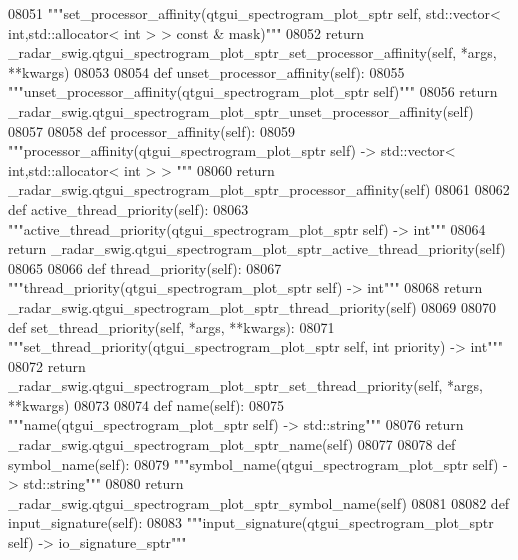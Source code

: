 \begin{DoxyCode}
{{{{{{{{{{{{{{{{{{{{{{{{{{08051         \textcolor{stringliteral}{"""set\_processor\_affinity(qtgui\_spectrogram\_plot\_sptr self, std::vector< int,std::allocator< int >
       > const & mask)"""}
08052         \textcolor{keywordflow}{return} \_radar\_swig.qtgui\_spectrogram\_plot\_sptr\_set\_processor\_affinity(self, *args, **kwargs)
08053 
08054     \textcolor{keyword}{def }unset_processor_affinity(self):
08055         \textcolor{stringliteral}{"""unset\_processor\_affinity(qtgui\_spectrogram\_plot\_sptr self)"""}
08056         \textcolor{keywordflow}{return} \_radar\_swig.qtgui\_spectrogram\_plot\_sptr\_unset\_processor\_affinity(self)
08057 
08058     \textcolor{keyword}{def }processor_affinity(self):
08059         \textcolor{stringliteral}{"""processor\_affinity(qtgui\_spectrogram\_plot\_sptr self) -> std::vector< int,std::allocator< int > >
      """}
08060         \textcolor{keywordflow}{return} \_radar\_swig.qtgui\_spectrogram\_plot\_sptr\_processor\_affinity(self)
08061 
08062     \textcolor{keyword}{def }active_thread_priority(self):
08063         \textcolor{stringliteral}{"""active\_thread\_priority(qtgui\_spectrogram\_plot\_sptr self) -> int"""}
08064         \textcolor{keywordflow}{return} \_radar\_swig.qtgui\_spectrogram\_plot\_sptr\_active\_thread\_priority(self)
08065 
08066     \textcolor{keyword}{def }thread_priority(self):
08067         \textcolor{stringliteral}{"""thread\_priority(qtgui\_spectrogram\_plot\_sptr self) -> int"""}
08068         \textcolor{keywordflow}{return} \_radar\_swig.qtgui\_spectrogram\_plot\_sptr\_thread\_priority(self)
08069 
08070     \textcolor{keyword}{def }set_thread_priority(self, *args, **kwargs):
08071         \textcolor{stringliteral}{"""set\_thread\_priority(qtgui\_spectrogram\_plot\_sptr self, int priority) -> int"""}
08072         \textcolor{keywordflow}{return} \_radar\_swig.qtgui\_spectrogram\_plot\_sptr\_set\_thread\_priority(self, *args, **kwargs)
08073 
08074     \textcolor{keyword}{def }name(self):
08075         \textcolor{stringliteral}{"""name(qtgui\_spectrogram\_plot\_sptr self) -> std::string"""}
08076         \textcolor{keywordflow}{return} \_radar\_swig.qtgui\_spectrogram\_plot\_sptr\_name(self)
08077 
08078     \textcolor{keyword}{def }symbol_name(self):
08079         \textcolor{stringliteral}{"""symbol\_name(qtgui\_spectrogram\_plot\_sptr self) -> std::string"""}
08080         \textcolor{keywordflow}{return} \_radar\_swig.qtgui\_spectrogram\_plot\_sptr\_symbol\_name(self)
08081 
08082     \textcolor{keyword}{def }input_signature(self):
08083         \textcolor{stringliteral}{"""input\_signature(qtgui\_spectrogram\_plot\_sptr self) -> io\_signature\_sptr"""}
}}}}}}}}}}}}}}}}}}}}}}}}}}
\end{DoxyCode}
